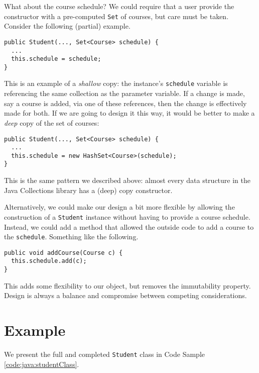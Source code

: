 What about the course schedule?  We could require that a user
provide the constructor with a pre-computed \texttt{Set}
of courses, but care must be taken.  Consider the following
(partial) example.

\begin{verbatim}
public Student(..., Set<Course> schedule) {
  ...
  this.schedule = schedule;
}
\end{verbatim}

This is an example of a \emph{shallow} copy: the instance's
\texttt{schedule} variable is referencing the same collection
as the parameter variable.  If a change is made, say a course is
added, via one of these references, then the change is effectively
made for both.  If we are going to design it this way, it would
be better to make a \emph{deep} copy of the set of courses:

\begin{verbatim}
public Student(..., Set<Course> schedule) {
  ...
  this.schedule = new HashSet<Course>(schedule);
}
\end{verbatim}

This is the same pattern we described above: almost every data
structure in the Java Collections library has a (deep) copy
constructor.  

Alternatively, we could make our design a bit more flexible by
allowing the construction of a \texttt{Student} instance
without having to provide a course schedule.  Instead, we could
add a method that allowed the outside code to add a course to
the \texttt{schedule}.  Something like the following.

\begin{verbatim}
public void addCourse(Course c) {
  this.schedule.add(c);
}
\end{verbatim}

This adds some flexibility to our object, but removes the immutability
property.  Design is always a balance and compromise between competing
considerations.

\section{Example}

We present the full and completed \texttt{Student} class in
Code Sample \ref{code:java:studentClass}.

\newpage
\inputminted[fontsize=\small,bgcolor={}]{java}{code/Student.java}


